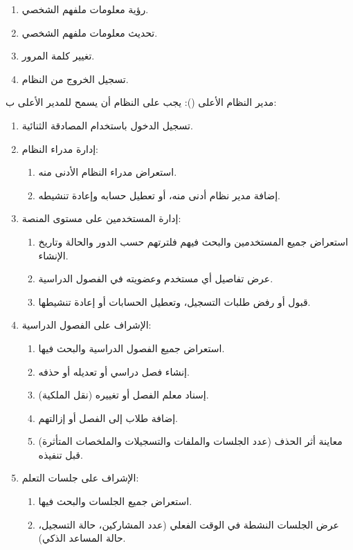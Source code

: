 \begin{enumerate}
  \item رؤية معلومات ملفهم الشخصي.
  \item تحديث معلومات ملفهم الشخصي.
  \item تغيير كلمة المرور.
  \item تسجيل الخروج من النظام.
\end{enumerate}

\noindent مدير النظام الأعلى (): يجب على النظام أن يسمح للمدير الأعلى ب:

\begin{enumerate}
  \item تسجيل الدخول باستخدام المصادقة الثنائية.
  \item إدارة مدراء النظام:
  \begin{enumerate}
    \item استعراض مدراء النظام الأدنى منه.
    \item إضافة مدير نظام أدنى منه، أو تعطيل حسابه وإعادة تنشيطه.
  \end{enumerate}
  \item إدارة المستخدمين على مستوى المنصة:
  \begin{enumerate}
    \item استعراض جميع المستخدمين والبحث فيهم فلترتهم حسب الدور والحالة وتاريخ الإنشاء.
    \item عرض تفاصيل أي مستخدم وعضويته في الفصول الدراسية.
    \item قبول أو رفض طلبات التسجيل، وتعطيل الحسابات أو إعادة تنشيطها.
  \end{enumerate}
  \item الإشراف على الفصول الدراسية:
  \begin{enumerate}
    \item استعراض جميع الفصول الدراسية والبحث فيها.
    \item إنشاء فصل دراسي أو تعديله أو حذفه.
    \item إسناد معلم الفصل أو تغييره (نقل الملكية).
    \item إضافة طلاب إلى الفصل أو إزالتهم.
    \item معاينة أثر الحذف (عدد الجلسات والملفات والتسجيلات والملخصات المتأثرة) قبل تنفيذه.
  \end{enumerate}
  \item الإشراف على جلسات التعلم:
  \begin{enumerate}
    \item استعراض جميع الجلسات والبحث فيها.
    \item عرض الجلسات النشطة في الوقت الفعلي (عدد المشاركين، حالة التسجيل، حالة المساعد الذكي).

\end{enumerate}
\end{enumerate}
